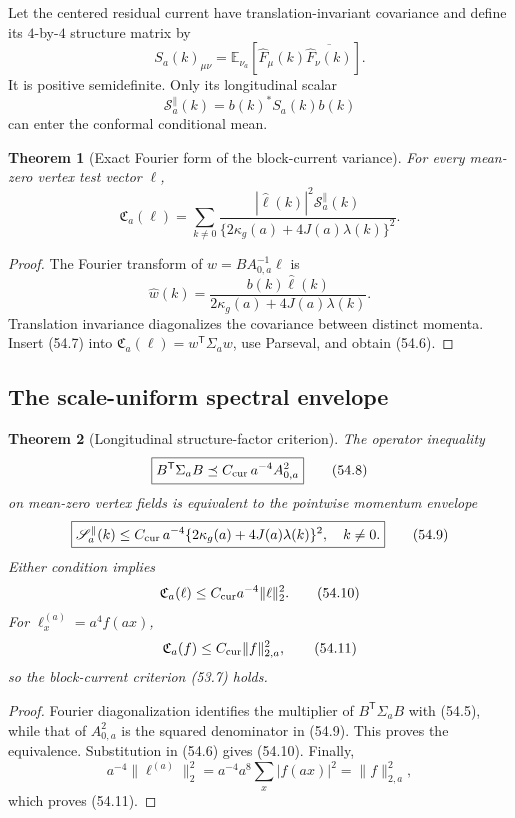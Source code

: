 \documentclass[11pt]{article}
\newtheorem{theorem}{Theorem}[section]
\theoremstyle{remark}
\begin{document}
Let the centered residual current have translation-invariant
covariance and define its \(4\)-by-\(4\) structure matrix by
\[
 S_a(k)_{\mu\nu}
 =
 \mathbb E_{\nu_a}
 [\widehat F_\mu(k)\overline{\widehat F_\nu(k)}]. \tag{54.4}
\]
It is positive semidefinite.  Only its longitudinal scalar
\[
 \mathscr S_a^{\parallel}(k)
 =
 b(k)^*S_a(k)b(k)                                 \tag{54.5}
\]
can enter the conformal conditional mean.

\begin{theorem}[Exact Fourier form of the block-current variance]
\label{thm:v17v54-fourier}
For every mean-zero vertex test vector \(\ell\),
\[
\boxed{
 \mathfrak C_a(\ell)
 =
 \sum_{k\ne0}
 \frac{|\widehat\ell(k)|^2
 \mathscr S_a^{\parallel}(k)}
 {\{2\kappa_g(a)+4J(a)\lambda(k)\}^2}.}           \tag{54.6}
\]
\end{theorem}

\begin{proof}
The Fourier transform of
\(w=BA_{0,a}^{-1}\ell\) is
\[
 \widehat w(k)=
 \frac{b(k)\widehat\ell(k)}
 {2\kappa_g(a)+4J(a)\lambda(k)}.                  \tag{54.7}
\]
Translation invariance diagonalizes the covariance between distinct
momenta.  Insert (54.7) into
\(\mathfrak C_a(\ell)=w^{\mathsf T}\Sigma_aw\), use Parseval, and
obtain (54.6).
\end{proof}

\subsection{The scale-uniform spectral envelope}

\begin{theorem}[Longitudinal structure-factor criterion]
\label{thm:v17v54-envelope}
The operator inequality
\[
\boxed{
 B^{\mathsf T}\Sigma_aB
 \preceq
 C_{\rm cur}\,a^{-4}A_{0,a}^2}                   \tag{54.8}
\]
on mean-zero vertex fields is equivalent to the pointwise momentum
envelope
\[
\boxed{
 \mathscr S_a^{\parallel}(k)
 \leq
 C_{\rm cur}\,a^{-4}
 \{2\kappa_g(a)+4J(a)\lambda(k)\}^2,
 \quad k\ne0.}                                   \tag{54.9}
\]
Either condition implies
\[
 \mathfrak C_a(\ell)
 \leq C_{\rm cur}a^{-4}\|\ell\|_2^2.              \tag{54.10}
\]
For \(\ell_x^{(a)}=a^4f(ax)\),
\[
 \mathfrak C_a(f)
 \leq C_{\rm cur}\|f\|_{2,a}^2,                  \tag{54.11}
\]
so the block-current criterion (53.7) holds.
\end{theorem}

\begin{proof}
Fourier diagonalization identifies the multiplier of
\(B^{\mathsf T}\Sigma_aB\) with (54.5), while that of \(A_{0,a}^2\)
is the squared denominator in (54.9).  This proves the equivalence.
Substitution in (54.6) gives (54.10).  Finally,
\[
 a^{-4}\|\ell^{(a)}\|_2^2
 =
 a^{-4}a^8\sum_x|f(ax)|^2
 =
 \|f\|_{2,a}^2,
\]
which proves (54.11).
\end{proof}
\end{document}
